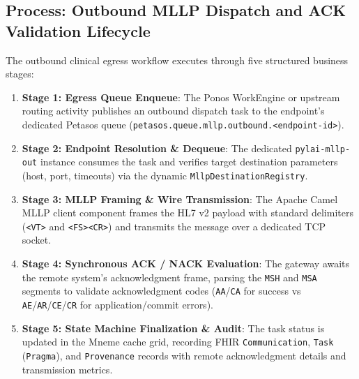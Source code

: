 \subsection{Process: Outbound MLLP Dispatch and ACK Validation Lifecycle}
The outbound clinical egress workflow executes through five structured business stages:
\begin{enumerate}
    \item \textbf{Stage 1: Egress Queue Enqueue}: The Ponos WorkEngine or upstream routing activity publishes an outbound dispatch task to the endpoint's dedicated Petasos queue (\texttt{petasos.queue.mllp.outbound.<endpoint-id>}).
    \item \textbf{Stage 2: Endpoint Resolution \& Dequeue}: The dedicated \texttt{pylai-mllp-out} instance consumes the task and verifies target destination parameters (host, port, timeouts) via the dynamic \texttt{MllpDestinationRegistry}.
    \item \textbf{Stage 3: MLLP Framing \& Wire Transmission}: The Apache Camel MLLP client component frames the HL7 v2 payload with standard delimiters (\texttt{<VT>} and \texttt{<FS><CR>}) and transmits the message over a dedicated TCP socket.
    \item \textbf{Stage 4: Synchronous ACK / NACK Evaluation}: The gateway awaits the remote system's acknowledgment frame, parsing the \texttt{MSH} and \texttt{MSA} segments to validate acknowledgment codes (\texttt{AA}/\texttt{CA} for success vs \texttt{AE}/\texttt{AR}/\texttt{CE}/\texttt{CR} for application/commit errors).
    \item \textbf{Stage 5: State Machine Finalization \& Audit}: The task status is updated in the Mneme cache grid, recording FHIR \texttt{Communication}, \texttt{Task} (\texttt{Pragma}), and \texttt{Provenance} records with remote acknowledgment details and transmission metrics.
\end{enumerate}

